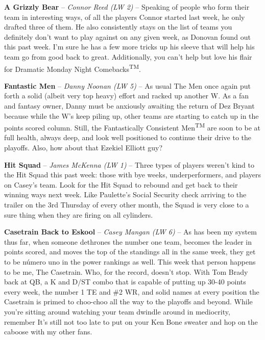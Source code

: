\documentclass[11pt,letterpaper]{article}
\begin{document}
\begin{etaremune}
\item \textbf{A Grizzly Bear} -- \textit{Connor Reed (LW 2)} -- Speaking of people who form their team in interesting ways, of all the players Connor started last week, he only drafted three of them. He also consistently stays on the list of teams you definitely don't want to play against on any given week, as Donovan found out this past week. I'm sure he has a few more tricks up his sleeve that will help his team go from good back to great. Additionally, you can't help but love his flair for Dramatic Monday Night Comebacks\textsuperscript{TM}.
\item \textbf{Fantastic Men} -- \textit{Danny Noonan (LW 5)} -- As usual The Men once again put forth a solid (albeit very top heavy) effort and racked up another W. As a fan and fantasy owner, Danny must be anxiously awaiting the return of Dez Bryant because while the W's keep piling up, other teams are starting to catch up in the points scored column. Still, the Fantastically Consistent Men\textsuperscript{TM} are soon to be at full health, always deep, and look well positioned to continue their drive to the playoffs. Also, how about that Ezekiel Elliott guy?
\newpage
\item \textbf{Hit Squad} -- \textit{James McKenna (LW 1)} -- Three types of players weren't kind to the Hit Squad this past week: those with bye weeks, underperformers, and players on Casey's team. Look for the Hit Squad to rebound and get back to their winning ways next week. Like Paulette's Social Security check arriving to the trailer on the 3rd Thursday of every other month, the Squad is very close to a sure thing when they are firing on all cylinders.
\item \textbf{Casetrain Back to Eskool} -- \textit{Casey Mangan (LW 6)} -- As has been my system thus far, when someone dethrones the number one team, becomes the leader in points scored, and moves the top of the standings all in the same week, they get to be número uno in the power rankings as well. This week that person happens to be me, The Casetrain. Who, for the record, doesn't stop. With Tom Brady back at QB, a K and D/ST combo that is capable of putting up 30-40 points every week, the number 1 TE and \#2 WR, and solid names at every position the Casetrain is primed to choo-choo all the way to the playoffs and beyond. While you're sitting around watching your team dwindle around in mediocrity, remember It's still not too late to put on your Ken Bone sweater and hop on the caboose with my other fans. 
\end{etaremune}
\end{document}
